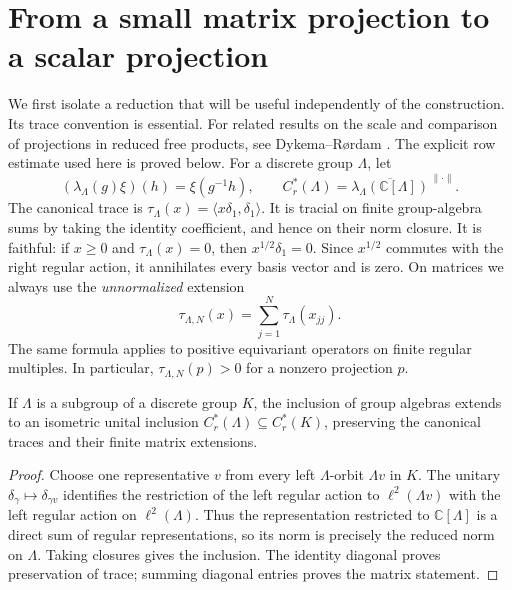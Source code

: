 \section{From a small matrix projection to a scalar projection}
\label{sec:scalar}

We first isolate a reduction that will be useful independently of the
construction. Its trace convention is essential.
For related results on the scale and comparison of projections in
reduced free products, see Dykema--R{\o}rdam \cite{DR1998,DR2000,DRII2000}.
The explicit row estimate used here is proved below.
For a discrete group \(\Lambda\), let
\[
 (\lambda_\Lambda(g)\xi)(h)=\xi(g^{-1}h),\qquad
 C_r^*(\Lambda)=
 \overline{\lambda_\Lambda(\mathbb C[\Lambda])}^{\,\|\cdot\|}.
\]
The canonical trace is
\(\tau_\Lambda(x)=\langle x\delta_1,\delta_1\rangle\).
It is tracial on finite group-algebra sums by taking the identity
coefficient, and hence on their norm closure. It is faithful:
if \(x\ge0\) and \(\tau_\Lambda(x)=0\), then
\(x^{1/2}\delta_1=0\). Since \(x^{1/2}\) commutes with the
right regular action, it annihilates every basis vector and is zero.
On matrices we always use the \emph{unnormalized} extension
\begin{equation}
 \tau_{\Lambda,N}(x)=\sum_{j=1}^N\tau_\Lambda(x_{jj}).
 \label{scalar:matrix-trace}
\end{equation}
The same formula applies to positive equivariant operators on finite
regular multiples. In particular,
\(\tau_{\Lambda,N}(p)>0\) for a nonzero projection \(p\).

\begin{lemma}
\label{scalar:subgroup}
If \(\Lambda\) is a subgroup of a discrete group \(K\), the inclusion of
group algebras extends to an isometric unital inclusion
\(C_r^*(\Lambda)\subseteq C_r^*(K)\), preserving the canonical traces
and their finite matrix extensions.
\end{lemma}

\begin{proof}
Choose one representative \(v\) from every left \(\Lambda\)-orbit
\(\Lambda v\) in \(K\). The unitary
\(\delta_\gamma\mapsto\delta_{\gamma v}\) identifies the restriction
of the left regular action to \(\ell^2(\Lambda v)\) with the left
regular action on \(\ell^2(\Lambda)\). Thus the representation
restricted to \(\mathbb C[\Lambda]\) is a direct sum of regular
representations, so its norm is precisely the reduced norm on
\(\Lambda\). Taking closures gives the inclusion. The identity
diagonal proves preservation of trace; summing diagonal entries proves
the matrix statement.
\end{proof}


